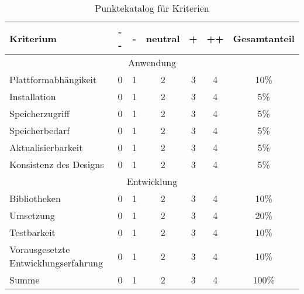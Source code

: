 \begin{table}[h]
	\centering
	\begin{tabularx}{\textwidth}{|l||c|c|c|c|c|c|}
		\hline
		Kriterium              & - - & - & neutral & + & ++ & Gesamtanteil \\
		\hline
		\multicolumn{7}{c}{Anwendung}                                      \\
		\hline
		Plattformabhängikeit   & 0   & 1 & 2       & 3 & 4  & 10\%         \\
		Installation           & 0   & 1 & 2       & 3 & 4  & 5\%          \\
		Speicherzugriff        & 0   & 1 & 2       & 3 & 4  & 5\%          \\
		Speicherbedarf         & 0   & 1 & 2       & 3 & 4  & 5\%          \\
		Aktualisierbarkeit     & 0   & 1 & 2       & 3 & 4  & 5\%          \\
		Konsistenz des Designs & 0   & 1 & 2       & 3 & 4  & 5\%         \\

		\hline
		\multicolumn{7}{c}{Entwicklung}                                    \\
		\hline
		Bibliotheken           & 0   & 1 & 2       & 3 & 4  & 10\%         \\
		Umsetzung              & 0   & 1 & 2       & 3 & 4  & 20\%         \\
		Testbarkeit            & 0   & 1 & 2       & 3 & 4  & 10\%         \\
		Vorausgesetzte Entwicklungserfahrung    & 0   & 1 & 2       & 3 & 4  & 10\%         \\

		\hline

		\hline
		Summe                  & 0   & 1 & 2       & 3 & 4  & 100\%        \\
		\hline
	\end{tabularx}
	\caption{Punktekatalog für Kriterien} \label{tab:punktekatalog}
\end{table}




